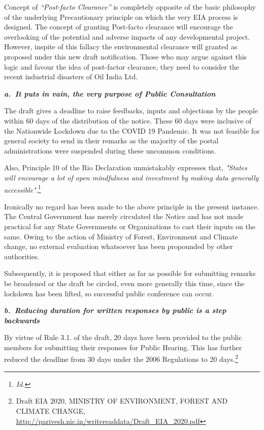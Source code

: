 \begin{multicols}{2}
\noi
Concept of \textit{“Post-facto Clearance”} is completely opposite of the basic philosophy of the
underlying Precautionary principle on which the very EIA process is designed. The concept
of granting Post-facto clearance will encourage the overlooking of the potential and adverse impacts of any developmental project. However, inspite of this fallacy the environmental
clearance will granted as proposed under this new draft notification. Those who may argue
against this logic and favour the idea of post-factor clearance, they need to consider the recent
industrial disasters of Oil India Ltd.


\vspace{-.15cm}

\noi
{\large\it\bfseries a.~It puts in vain, the very purpose of Public Consultation}

\vspace{-.15cm}

\noi
The draft gives a deadline to raise feedbacks, inputs and objections by the people within 60
days of the distribution of the notice. These 60 days were inclusive of the Nationwide
Lockdown due to the COVID 19 Pandemic. It was not feasible for general society to send in
their remarks as the majority of the postal administrations were suspended during these
uncommon conditions.

\noi
Also, Principle 10 of the Rio Declaration unmistakably expresses that, \textit{"States will encourage
a lot of open mindfulness and investment by making data generally accessible"}.\footnote{\textit{Id.}}

\noi
Ironically no regard has been made to the above principle in the present instance. The Central
Government has merely circulated the Notice and has not made practical for any State
Governments or Organizations to cast their inputs on the same. Owing to the action of
Ministry of Forest, Environment and Climate change, no external evaluation whatsoever has
been propounded by other authorities.

\noi
Subsequently, it is proposed that either as far as possible for submitting remarks be
broadened or the draft be circled, even more generally this time, since the lockdown has been
lifted, so successful public conference can occur.  

\noi
{\large\it\bfseries b.~Reducing duration for written responses by public is a step backwards}

\noi
By virtue of Rule 3.1. of the draft, 20 days have been provided to the public members for
submitting their responses for Public Hearing. This has further reduced the deadline from 30
days under the 2006 Regulations to 20 days.\footnote{Draft EIA 2020, MINISTRY OF ENVIRONMENT, FOREST AND CLIMATE CHANGE,
\url{http://parivesh.nic.in/writereaddata/Draft_EIA_2020.pdf}}


\end{multicols}
